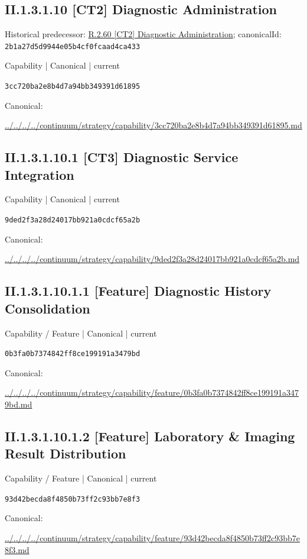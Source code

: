 \documentclass[10pt,a4paper]{article}
\begin{document}
\subsection*{II.1.3.1.10 [CT2] Diagnostic Administration}
Historical predecessor: \hyperref[element-2b1a27d5d9944e05b4cf0fcaad4ca433]{R.2.60 [CT2] Diagnostic Administration}; canonicalId: \texttt{2b1a27d5d9944e05b4cf0fcaad4ca433}\par
\label{element-3cc720ba2e8b4d7a94bb349391d61895}
{\small Capability | Canonical | current}\par
\texttt{3cc720ba2e8b4d7a94bb349391d61895}\par
Canonical: \par
{\footnotesize\url{../../../../continuum/strategy/capability/3cc720ba2e8b4d7a94bb349391d61895.md}}\par
\subsection*{II.1.3.1.10.1 [CT3] Diagnostic Service Integration}
\label{element-9ded2f3a28d24017bb921a0cdcf65a2b}
{\small Capability | Canonical | current}\par
\texttt{9ded2f3a28d24017bb921a0cdcf65a2b}\par
Canonical: \par
{\footnotesize\url{../../../../continuum/strategy/capability/9ded2f3a28d24017bb921a0cdcf65a2b.md}}\par
\subsection*{II.1.3.1.10.1.1 [Feature] Diagnostic History Consolidation}
\label{element-0b3fa0b7374842ff8ce199191a3479bd}
{\small Capability / Feature | Canonical | current}\par
\texttt{0b3fa0b7374842ff8ce199191a3479bd}\par
Canonical: \par
{\footnotesize\url{../../../../continuum/strategy/capability/feature/0b3fa0b7374842ff8ce199191a3479bd.md}}\par
\subsection*{II.1.3.1.10.1.2 [Feature] Laboratory \& Imaging Result Distribution}
\label{element-93d42becda8f4850b73ff2c93bb7e8f3}
{\small Capability / Feature | Canonical | current}\par
\texttt{93d42becda8f4850b73ff2c93bb7e8f3}\par
Canonical: \par
{\footnotesize\url{../../../../continuum/strategy/capability/feature/93d42becda8f4850b73ff2c93bb7e8f3.md}}\par
\end{document}
